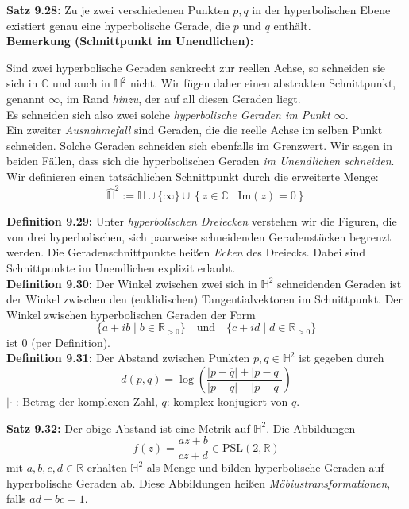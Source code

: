 \documentclass[fleqn, 12pt, letterpaper]{article}
\begin{document}
\medskip

\textbf{Satz 9.28:}  
Zu je zwei verschiedenen Punkten \( p, q \) in der hyperbolischen Ebene existiert genau eine hyperbolische Gerade, die \( p \) und \( q \) enthält.\\

\textbf{Bemerkung (Schnittpunkt im Unendlichen):}

Sind zwei hyperbolische Geraden senkrecht zur reellen Achse, so schneiden sie sich in \( \mathbb{C} \) und auch in \( \mathbb{H}^2 \) nicht.  
Wir fügen daher einen abstrakten Schnittpunkt, genannt \( \infty \), im Rand \emph{hinzu}, der auf all diesen Geraden liegt.\\

Es schneiden sich also zwei solche \emph{hyperbolische Geraden im Punkt \( \infty \)}.\\

Ein zweiter \emph{Ausnahmefall} sind Geraden, die die reelle Achse im selben Punkt schneiden.  
Solche Geraden schneiden sich ebenfalls im Grenzwert.  
Wir sagen in beiden Fällen, dass sich die hyperbolischen Geraden \emph{im Unendlichen schneiden}.\\

Wir definieren einen tatsächlichen Schnittpunkt durch die erweiterte Menge:
\[
\widehat{\mathbb{H}}^2 := \mathbb{H} \cup \{ \infty \} \cup \left\{ z \in \mathbb{C} \mid \mathrm{Im}(z) = 0 \right\}
\]

\textbf{Definition 9.29:} Unter \emph{hyperbolischen Dreiecken} verstehen wir die Figuren,  
die von drei hyperbolischen, sich paarweise schneidenden Geradenstücken begrenzt werden.  
Die Geradenschnittpunkte heißen \emph{Ecken} des Dreiecks. Dabei sind Schnittpunkte im Unendlichen explizit erlaubt.\\

\textbf{Definition 9.30:} Der Winkel zwischen zwei sich in \( \mathbb{H}^2 \) schneidenden Geraden  
ist der Winkel zwischen den (euklidischen) Tangentialvektoren im Schnittpunkt.  
Der Winkel zwischen hyperbolischen Geraden der Form  
\[
\{ a + ib \mid b \in \mathbb{R}_{>0} \} \quad \text{und} \quad \{ c + id \mid d \in \mathbb{R}_{>0} \}
\]  
ist \( 0 \) (per Definition).\\

\textbf{Definition 9.31:} Der Abstand zwischen Punkten \( p, q \in \mathbb{H}^2 \) ist gegeben durch
\[
d(p, q) = \log \left( \frac{ |p - \overline{q}| + |p - q| }{ |p - \overline{q}| - |p - q| } \right)
\]
\( |\cdot| \): Betrag der komplexen Zahl, \quad \( \overline{q} \): komplex konjugiert von \( q \).

\vspace{1em}

\textbf{Satz 9.32:} Der obige Abstand ist eine Metrik auf \( \mathbb{H}^2 \).  
Die Abbildungen
\[
f(z) = \frac{az + b}{cz + d} \in \mathrm{PSL}(2, \mathbb{R})
\]
mit \( a, b, c, d \in \mathbb{R} \) erhalten \( \mathbb{H}^2 \) als Menge und bilden hyperbolische Geraden auf hyperbolische Geraden ab.  
Diese Abbildungen heißen \emph{Möbiustransformationen}, falls \( ad - bc = 1 \).

\end{document}
